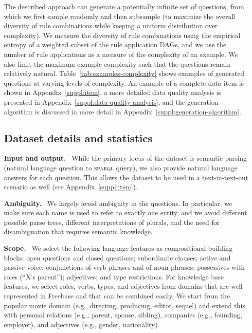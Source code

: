 \documentclass[letterpaper]{article}
\newcommand{\myparagraph}[1]{\textbf{#1}~}
\newcommand{\SPARQL}{\textsc{sparql}}
\begin{document}
The described approach can generate a potentially infinite set of questions, from which we first sample randomly and then subsample (to maximize the overall diversity of rule combinations while keeping a uniform distribution over complexity).
We measure the diversity of rule combinations using the empirical entropy of a weighted subset of the rule application DAGs, and we use the number of rule applications as a measure of the complexity of an example.
We also limit the maximum example complexity such that the questions remain relatively natural.
Table~\ref{tab:examples-complexity} shows examples of generated questions at varying levels of complexity. 
An example of a complete data item is shown in Appendix~\ref{suppl:item}, a more detailed data quality analysis is presented in Appendix~\ref{suppl:data-quality-analysis}, and the generation algorithm is discussed in more detail in Appendix~\ref{suppl:generation-algorithm}.

\subsection{Dataset details and statistics}
\label{sect:cfq-details}

\myparagraph{Input and output.}
While the primary focus of the dataset is semantic parsing (natural language question to \SPARQL{} query), we also provide natural language answers for each question. This allows the dataset to be used in a text-in-text-out scenario as well (see Appendix~\ref{suppl:item}).

\myparagraph{Ambiguity.}
We largely avoid ambiguity in the questions. In particular, we make sure each name is used to refer to exactly one entity, and we avoid different possible parse trees, different interpretations of plurals, and the need for disambiguation that requires semantic knowledge.

\myparagraph{Scope.}
We select the following language features as compositional building blocks: 
open questions and closed questions;
subordinate clauses;
active and passive voice;
conjunctions of verb phrases and of noun phrases;
possessives with roles (``X's parent'');
adjectives;
and type restrictions.
For knowledge base features, we select roles, verbs, types, and adjectives from domains that are well-represented in Freebase and that can be combined easily. We start from the popular movie domain (e.g., directing, producing, editor, sequel) and extend this with personal relations (e.g., parent, spouse, sibling), companies (e.g., founding, employer), and adjectives (e.g., gender, nationality).
\end{document}

